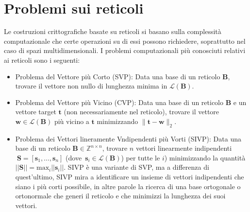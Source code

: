 \section{Problemi sui reticoli}
\label{problemi}
Le costruzioni crittografiche basate su reticoli si basano sulla complessità 
computazionale che certe operazioni su di essi possono richiedere, 
soprattutto nel caso di spazi multidimensionali. I problemi computazionali 
più conosciuti relativi ai reticoli sono i seguenti:
\begin{itemize}
    \item Problema del Vettore più Corto (SVP): Data una base di un reticolo $\mathbf{B}$, 
    trovare il vettore non nullo di lunghezza minima in $\mathcal{L}(\mathbf{B})$.
    \item Problema del Vettore più Vicino (CVP): Data una base di un reticolo $\mathbf{B}$ e un 
    vettore target $\mathbf{t}$ (non necessariamente nel reticolo), trovare il vettore 
    $\mathbf{w} \in \mathcal{L}(\mathbf{B})$ più vicino a $\mathbf{t}$ minimizzando 
    $\|\mathbf{t}-\mathbf{w}\|_2$.
    \item Problema dei Vettori lineramente Vndipendenti più Vorti (SIVP): Data una base di un reticolo 
    $\mathbf{B} \in \mathbb{Z}^{n\times n}$, trovare $n$ vettori linearmente indipendenti 
    $\ {\mathbf{S} = [\mathbf{s}_1, \dots, \mathbf{s}_n]}$ 
    \mbox{(dove  $\mathbf{s}_i \in \mathcal{L}(\mathbf{B})$)}
    per tutte le $i$) minimizzando la quantità 
    ${||\mathbf{S}|| = \text{max}_i||\mathbf{s}_i||}$. 
    SIVP è una variante di SVP, ma a differenza di quest'ultimo, SIVP mira a identificare 
    un insieme di vettori indipendenti che siano i più corti possibile, in altre parole 
    la ricerca di una base ortogonale o ortonormale che generi il reticolo e che minimizzi
     la lunghezza dei suoi vettori.
    \end{itemize}

